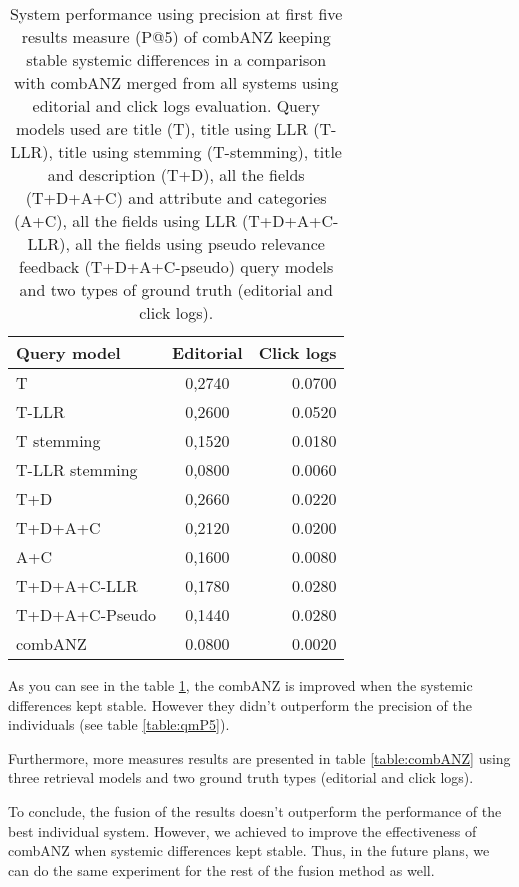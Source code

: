 \begin{table}[H]
\begin{center}
\footnotesize
\caption{System performance   using precision at first five results measure (P@5) of combANZ keeping stable systemic differences in a comparison with combANZ merged from all systems using editorial and click logs evaluation. Query models used are title (T), title using LLR (T-LLR), title using stemming (T-stemming), title and description (T+D), all the fields (T+D+A+C) and attribute and categories (A+C), all the fields using LLR (T+D+A+C-LLR), all the fields using pseudo relevance feedback (T+D+A+C-pseudo) query models and two types of ground truth (editorial and click logs).}
\label{table:combANZP5}
\begin{tabular}{lcr}
\midrule
 Query model & Editorial & Click logs \\
 \midrule
	T & 0,2740 & 0.0700 \\
	T-LLR & 0,2600 & 0.0520 \\
	T stemming & 0,1520 & 0.0180 \\
	T-LLR stemming & 0,0800 & 0.0060 \\
	T+D & 0,2660 & 0.0220 \\
	T+D+A+C & 0,2120 & 0.0200 \\
	A+C & 0,1600 & 0.0080 \\
	T+D+A+C-LLR & 0,1780 & 0.0280 \\
	T+D+A+C-Pseudo & 0,1440 & 0.0280 \\
	\midrule
	combANZ & 0.0800 & 0.0020 \\
\bottomrule
\end{tabular}
\end{center}
\end{table}



As you can see in the table \ref{table:combANZP5}, the combANZ is improved when the systemic differences kept stable. However they didn't outperform the precision of the individuals (see table \ref{table:qmP5}).


Furthermore, more measures results are presented in table \ref{table:combANZ} using three retrieval models and two ground truth types (editorial and click logs).

To conclude, the fusion of the results doesn't outperform the performance of the best individual system. However, we achieved to improve the effectiveness of combANZ when systemic differences kept stable. Thus, in the future plans, we can do the same experiment for the rest of the fusion method as well.

